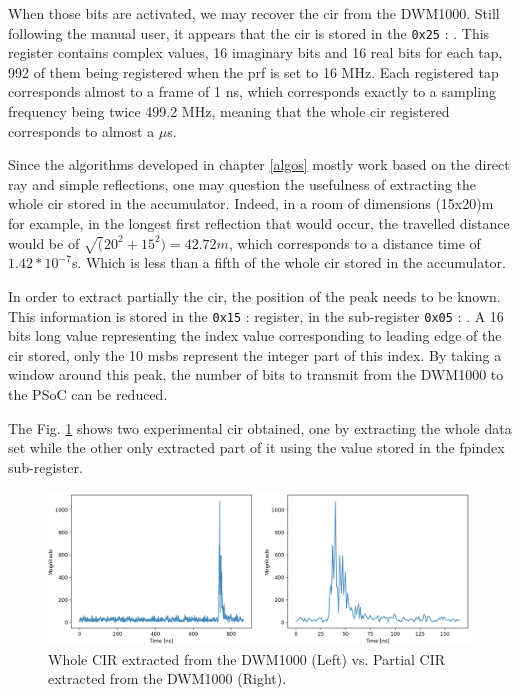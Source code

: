 When those bits are activated, we may recover the \gls{cir} from the DWM1000. Still following the manual user, it appears that the \gls{cir} is stored in the \texttt{0x25} : . This register contains complex values, 16 imaginary bits and 16 real bits for each tap, 992 of them being registered when the \gls{prf} is set to 16 MHz. Each registered tap corresponds almost to a frame of 1 ns, which corresponds exactly to a sampling frequency  being twice 499.2 MHz, meaning that the whole \gls{cir} registered corresponds to almost a $\mu$s.
\vspace{2mm}

Since the algorithms developed in chapter \ref{algos} mostly work based on the direct ray and simple reflections, one may question the usefulness of extracting the whole \gls{cir} stored in the accumulator. Indeed, in a room of dimensions (15x20)m for example, in the longest first reflection that would occur, the travelled distance would be of $\sqrt(20^2 + 15^2) = 42.72m$, which corresponds to a distance time of $1.42*10^{-7}$s. Which is less than a fifth of the whole \gls{cir} stored in the accumulator.
\vspace{2mm}

In order to extract partially the \gls{cir}, the position of the peak needs to be known. This information is stored in the \texttt{0x15} :  register, in the sub-register \texttt{0x05} :  . A 16 bits long value representing the index value corresponding to leading edge of the \gls{cir} stored, only the 10 \glspl{msb} represent the integer part of this index. By taking a window around this peak, the number of bits to transmit from the DWM1000 to the PSoC can be reduced.
\vspace{2mm}

The Fig. \ref{fig:cir_long_short} shows two experimental \gls{cir} obtained, one by extracting the whole data set while the other only extracted part of it using the value stored in the \gls{fpindex} sub-register.

\begin{figure}[H]
\centering
\includegraphics[width=\linewidth]{Images/extracted_cir.png}
\caption{Whole CIR extracted from the DWM1000 (Left) vs. Partial CIR extracted from the DWM1000 (Right). \label{fig:cir_long_short}}
\end{figure}

